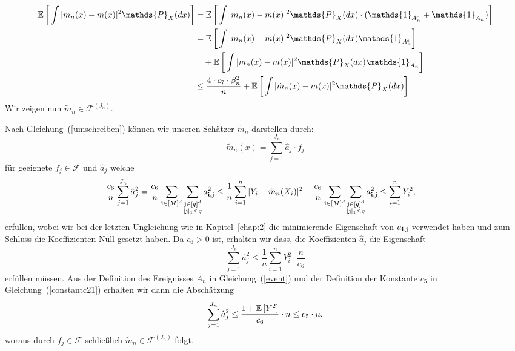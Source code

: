 \begin{equation}
\label{originaleq}
\begin{split}
\E \bigg[\int |m_n(x) - m(x)|^2 \mathds{P}_X(dx)\bigg] & = \E \bigg[\int |m_n(x) - m(x)|^2 \mathds{P}_X(dx) \cdot (\mathds{1}_{A_n^{\mathsf{c}}} + \mathds{1}_{A_n})\bigg] \\
& = \E \bigg[\int |m_n(x) - m(x)|^2 \mathds{P}_X(dx) \mathds{1}_{A_n^{\mathsf{c}}}\bigg] \\
& \quad + \E \bigg[\int |m_n(x) - m(x)|^2 \mathds{P}_X(dx) \mathds{1}_{A_n}\bigg] \\
& \leq \frac{4 \cdot c_7 \cdot \beta_n^2}{n} + \E \bigg[\int |\hat{m}_n(x) - m(x)|^2 \mathds{P}_X(dx)\bigg].
\end{split}
\end{equation}
Wir zeigen nun $\tilde{m}_n \in \mathcal{F}^{(J_n)}$.

Nach Gleichung~(\ref{umschreiben}) können wir unseren Schätzer $\tilde{m}_n$ darstellen durch:
$$\tilde{m}_n(x) = \sum_{j = 1}^{J_n}\hat{a}_j \cdot f_j$$
für geeignete $f_j \in \mathcal{F}$ und $\hat{a}_j$ welche 
\begin{equation*}
\begin{split}
\frac{c_6}{n}\sum_{j = 1}^{J_n} \hat{a}_j^2 & = \frac{c_6}{n} \sum_{\mathbf{i} \in [M]^d} \sum_{\substack{\mathbf{j} \in [q]^d \\ |\mathbf{j}|_1 \leq q}} a_{\mathbf{i},\mathbf{j}}^2
\leq \frac{1}{n} \sum_{i = 1}^n|Y_i - \tilde{m}_n(X_i)|^2 + \frac{c_6}{n} \sum_{\mathbf{i} \in [M]^d} \sum_{\substack{\mathbf{j} \in [q]^d \\ |\mathbf{j}|_1 \leq q}} a_{\mathbf{i},\mathbf{j}}^2 
\leq \sum_{i = 1}^n Y_i^2,
\end{split}
\end{equation*}
erfüllen, wobei wir bei der letzten Ungleichung wie in Kapitel~\ref{chap:2} die minimierende Eigenschaft von $a_{\mathbf{i},\mathbf{j}}$ verwendet haben und zum Schluss die Koeffizienten Null gesetzt haben. Da $c_6 > 0$ ist, erhalten wir dass, die Koeffizienten $\hat{a}_j$ die Eigenschaft
$$\sum_{j = 1}^{J_n} \hat{a}_j^2  \leq \frac{1}{n}\sum_{i = 1}^n Y_i^2 \cdot \frac{n}{c_6}$$
erfüllen müssen.
Aus der Definition des Ereignisses $A_n$ in Gleichung~(\ref{event}) und der Definition der Konstante $c_5$ in Gleichung~(\ref{constantc21}) erhalten wir dann die Abschätzung
$$\sum_{j = 1}^{J_n}\hat{a}_j^2 \leq \frac{1 + \mathbb{E}\,[Y^2]}{c_6} \cdot n \leq c_5 \cdot n,$$
woraus durch $f_j \in \mathcal{F}$ schließlich $\tilde{m}_n \in \mathcal{F}^{(J_n)}$ folgt.

